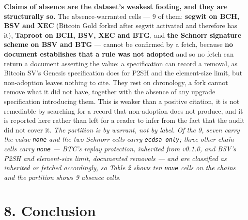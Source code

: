 \documentclass[
]{article}
\newcounter{none} %
\begin{document}
\textbf{Claims of absence are the dataset's weakest footing, and they
are structurally so.} The absence-warranted cells --- 9 of them:
\textbf{segwit on BCH, BSV and XEC} (Bitcoin Gold forked after segwit
activated and therefore has it), \textbf{Taproot on BCH, BSV, XEC and
BTG}, and \textbf{the Schnorr signature scheme on BSV and BTG} ---
cannot be confirmed by a fetch, because \textbf{no document establishes
that a rule was not adopted} and so no fetch can return a document
asserting the value: a specification can record a removal, as Bitcoin
SV's Genesis specification does for P2SH and the element-size limit, but
non-adoption leaves nothing to cite. They rest on chronology, a fork
cannot remove what it did not have, together with the absence of any
upgrade specification introducing them. This is weaker than a positive
citation, it is not remediable by searching for a record that
non-adoption does not produce, and it is reported here rather than left
for a reader to infer from the fact that the audit did not cover it.
\emph{The partition is by warrant, not by label. Of the 9, seven carry
the value \texttt{none} and the two Schnorr cells carry
\texttt{ecdsa-only}; three other chain cells carry \texttt{none} ---
BTC's replay protection, inherited from v0.1.0, and BSV's P2SH and
element-size limit, documented removals --- and are classified as
inherited or fetched accordingly, so Table 2 shows ten \texttt{none}
cells on the chains and the partition shows 9 absence cells.}

\section{8. Conclusion}\label{conclusion}
\end{document}
